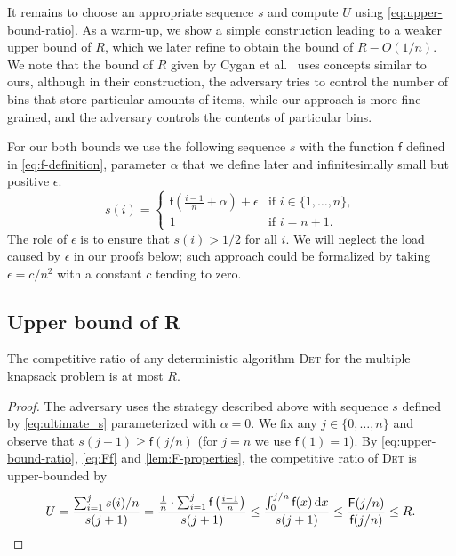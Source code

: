 \documentclass[a4paper,USenglish,cleveref]{lipics-v2019}
\newcommand{\R}{\ensuremath{R}}
\newcommand{\f}{\textsf{f}}
\newcommand{\fintegral}{\textsf{F}}
\newcommand{\dd}{\mathrm{d}}
\newcommand{\DET}{\textsc{Det}\xspace}
\begin{document}
It remains to choose an appropriate sequence $s$ and compute $U$ using \eqref{eq:upper-bound-ratio}. 
As a warm-up, we show a simple
construction leading to a weaker upper bound of $\R$, which we later refine to
obtain the bound of $\R - O(1/n)$. We note that the bound of $\R$ given by Cygan
et al.~\cite{CyJeSg16} uses concepts similar to ours, although in their
construction, the adversary tries to control the number of bins that store
particular amounts of items, while our approach is more fine-grained, and the
adversary controls the contents of particular bins. 

For our both bounds we use the following sequence $s$ with the function $\f$
defined in \eqref{eq:f-definition}, parameter $\alpha$ that we define later and
infinitesimally small but positive $\epsilon$. 
\begin{equation}
  \label{eq:ultimate_s}
    s(i) = \begin{cases}
      \f \left( \frac{i-1}{n} + \alpha \right) + \epsilon 
        & \text{if $i \in \{ 1, \ldots, n \}$}, \\
      1 & \text{if $i = n+1$}.
    \end{cases}
\end{equation}
The role of $\epsilon$ is to ensure that $s(i) > 1/2$ for all $i$. 
We will neglect the load caused by $\epsilon$ in our proofs below;
such approach could be formalized by taking $\epsilon = c/n^2$
with a constant $c$ tending to zero.



\subsection{Upper bound of R}

\begin{lemma}
\label{lem:upper-bound-weak}
The competitive ratio of any deterministic algorithm \DET for the multiple
knapsack problem is at most $\R$.
\end{lemma}

\begin{proof}
The adversary uses the strategy described above
with sequence $s$ defined by \eqref{eq:ultimate_s} parameterized
with $\alpha = 0$.
We fix any $j \in \{0, \ldots, n\}$ and observe that $s(j+1) \geq \f(j/n)$ 
(for $j = n$ we use $\f(1) = 1$).
By \eqref{eq:upper-bound-ratio}, \eqref{eq:Ff} and \cref{lem:F-properties}, the competitive ratio of \DET is 
upper-bounded by 
\[
  U = \frac{ \sum_{i = 1}^{j} s(i)/n }{s(j+1)}
  = \frac{ \frac{1}{n} \cdot \sum_{i = 1}^{j} \f \left( \frac{i-1}{n} \right)}
    {s(j+1)}
  \leq \frac{ \int_0^{j/n} \f (x) \, \dd x }{s(j+1)}
  \leq \frac{\fintegral(j/n)}{\f(j/n)}
  \leq \R.
\qedhere
\]
\end{proof}
\end{document}

